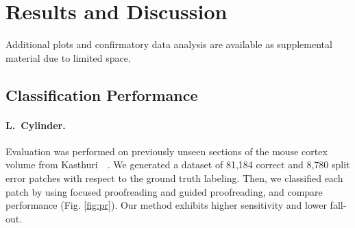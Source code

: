 \section{Results and Discussion}

Additional plots and confirmatory data analysis are available as supplemental material due to limited space. 

\subsection{Classification Performance}

\paragraph{L.~Cylinder.} Evaluation was performed on previously unseen sections of the mouse cortex volume from Kasthuri~\etal~\cite{kasthuri2015saturated}. We generated a dataset of 81,184 correct and 8,780 split error patches with respect to the ground truth labeling. Then, we classified each patch by using focused proofreading and guided proofreading, and compare performance (Fig. \ref{fig:pr}). Our method exhibits higher sensitivity and lower fall-out.%


